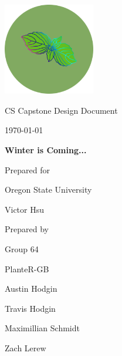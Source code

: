 \documentclass[onecolumn, draftclsnofoot,10pt, compsoc]{IEEEtran}
\def \CapstoneTeamName{			              			 PlanteR-GB}
\def \CapstoneTeamNumber{					           			 Group 64}
\def \GroupMemberOne{				           				Austin Hodgin}
\def \GroupMemberTwo{				           				Travis Hodgin}
\def \GroupMemberThree{			            Maximillian Schmidt}
\def\GroupMemberFour{		        	               Zach Lerew}
\def \CapstoneProjectName{	      	    Winter is Coming...}
\def \CapstoneSponsorCompany{		    Oregon State University}
\def \CapstoneSponsorPerson{		 			  				 Victor Hsu}
\def \DocType{		%
				Design Document
				}
\newcommand{\NameSigPair}[1]{\par
\makebox[2.75in][r]{#1} \hfil 	\makebox[3.25in]{\makebox[2.25in]{\hrulefill} \hfill		\makebox[.75in]{\hrulefill}}
\par\vspace{-12pt} \textit{\tiny\noindent
\makebox[2.75in]{} \hfil		\makebox[3.25in]{\makebox[2.25in][r]{Signature} \hfill	\makebox[.75in][r]{Date}}}}
\renewcommand{\NameSigPair}[1]{#1}
\begin{document}
\begin{titlepage}
    \begin{singlespace}
        \hfill

        \includegraphics[height=4cm]{logo.png}

        \par\vspace{.2in}
        \centering
        \scshape{
            \huge CS Capstone \DocType \par
            {\large\today}\par
            \vspace{.5in}
            \textbf{\Huge\CapstoneProjectName}\par

						\vspace{1in}

            {\large Prepared for}\par
            \Huge \CapstoneSponsorCompany\par
            \vspace{5pt}
            {\Large\NameSigPair{\CapstoneSponsorPerson}\par}

						\vspace{1in}

            {\large Prepared by}\par
						{\huge \CapstoneTeamNumber}\par
            \CapstoneTeamName\par
            \vspace{5pt}

            {
							\Large
							\NameSigPair{\GroupMemberOne}\par
							\NameSigPair{\GroupMemberTwo}\par
							\NameSigPair{\GroupMemberThree}\par
							\NameSigPair{\GroupMemberFour}\par
            }

            \vspace{20pt}
        }
				\newpage
        \begin{abstract}
				\noindent This document details the entire system design for the PlanteR-GB system
        \end{abstract}
    \end{singlespace}
\end{titlepage}
\end{document}
